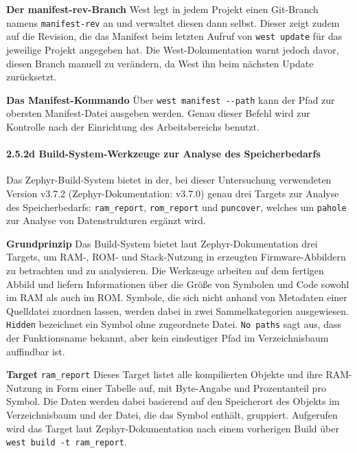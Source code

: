 \textbf{Der manifest-rev-Branch} West legt in jedem Projekt einen Git-Branch namens \lstinline[style=fileinline]|manifest-rev| an und verwaltet diesen dann selbst. Dieser zeigt zudem auf die Revision, die das Manifest beim letzten Aufruf von \lstinline[style=fileinline]|west update| f{\"u}r das jeweilige Projekt angegeben hat. Die West-Dokumentation warnt jedoch davor, diesen Branch manuell zu ver{\"a}ndern, da West ihn beim n{\"a}chsten Update zur{\"u}cksetzt.

\textbf{Das Manifest-Kommando }{\"U}ber \lstinline[style=fileinline]|west manifest --path| kann der Pfad zur obersten Manifest-Datei ausgeben werden. Genau dieser Befehl wird zur Kontrolle nach der Einrichtung des Arbeitsbereichs benutzt.

\paragraph*{\textbf{2.5.2d Build-System-Werkzeuge zur Analyse des Speicherbedarfs}}
Das Zephyr-Build-System bietet in der, bei dieser Untersuchung verwendeten Version v3.7.2 (Zephyr-Dokumentation: v3.7.0) genau drei Targets zur Analyse des Speicherbedarfs: \lstinline[style=fileinline]|ram_report|, \lstinline[style=fileinline]|rom_report| und \lstinline[style=fileinline]|puncover|, welches um \lstinline[style=fileinline]|pahole| zur Analyse von Datenstrukturen erg{\"a}nzt wird.

\textbf{Grundprinzip} Das Build-System bietet laut Zephyr-Dokumentation drei Targets, um RAM-, ROM- und Stack-Nutzung in erzeugten Firmware-Abbildern zu betrachten und zu analysieren. Die Werkzeuge arbeiten auf dem fertigen Abbild und liefern Informationen {\"u}ber die Gr{\"o}{\ss}e von Symbolen und Code sowohl im RAM als auch im ROM. Symbole, die sich nicht anhand von Metadaten einer Quelldatei zuordnen lassen, werden dabei in zwei Sammelkategorien ausgewiesen. \lstinline[style=fileinline]|Hidden| bezeichnet ein Symbol ohne zugeordnete Datei. \lstinline[style=fileinline]|No paths| sagt aus, dass der Funktionsname bekannt, aber kein eindeutiger Pfad im Verzeichnisbaum auffindbar ist.

\textbf{Target }\lstinline[style=fileinline]|ram_report| Dieses Target listet alle kompilierten Objekte und ihre RAM-Nutzung in Form einer Tabelle auf, mit Byte-Angabe und Prozentanteil pro Symbol. Die Daten werden dabei basierend auf den Speicherort des Objekts im Verzeichnisbaum und der Datei, die das Symbol enth{\"a}lt, gruppiert. Aufgerufen wird das Target laut Zephyr-Dokumentation nach einem vorherigen Build {\"u}ber \lstinline[style=fileinline]|west build -t ram_report|.

